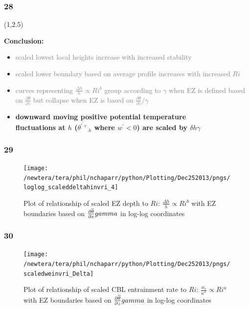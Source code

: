 \documentclass{beamer}
\newcommand\FrameText[1]{
\begin{textblock}{16}(1,2.5)
\raggedright #1
\end{textblock}}
\begin{document}
\begin{frame}
\frametitle{28}
\FrameText{\bf{\large Conclusion:}
\vspace{5mm}
\begin{itemize}
\item \textcolor{gray}{scaled lowest local heights increase with increased stability}
\vspace{5mm}
\item \textcolor{gray}{scaled lower boundary based on average profile increases with increased $Ri$}
\vspace{5mm}
\item \textcolor{gray}{curves representing  $\frac{\Delta h}{h} \propto Ri ^{b}$ group according to $\gamma$ when EZ is defined based on $\frac{\partial \overline{\theta}}{\partial z}$ but collapse when EZ is based on $\frac{\partial \overline{\theta}}{\partial z}/\gamma$}
\vspace{5mm} 
\item \bf{\large downward moving positive potential temperature\\
fluctuations at $h$ ($\overline{\theta^{'+}}_{h}$ where $w^{'}<0$) are scaled by $\delta h \gamma$}
\end{itemize}
}
\end{frame}

\begin{frame}
\frametitle{29}
\fontsize{12pt}{7.2}\selectfont
\vspace{3mm}
\begin{figure}
\centering
\texttt{[image: /newtera/tera/phil/nchaparr/python/Plotting/Dec252013/pngs/loglog\_scaleddeltahinvri\_4]}
\caption{Plot of relationship of scaled EZ depth to $Ri$: $\frac{\Delta h}{h} \propto Ri ^{b}$ with EZ boundaries based on $\frac{\partial \overline{\theta}}{\partial z}\/gamma$ in log-log coordinates}
\end{figure}
\end{frame}

\begin{frame}
\frametitle{30}
\fontsize{12pt}{7.2}\selectfont
\begin{figure}
\vspace{3mm}
\texttt{[image: /newtera/tera/phil/nchaparr/python/Plotting/Dec252013/pngs/scaledweinvri\_Delta]}
\caption{Plot of relationship of scaled CBL entrainment rate to $Ri$: $\frac{w_{e}}{w^{*}} \propto  Ri^{a}$ with EZ boundaries based on $\frac{\partial \overline{\theta}}{\partial z}\/gamma$ in log-log coordinates}
\end{figure}
\end{frame}
\end{document}
